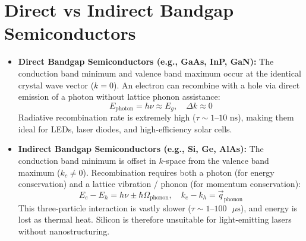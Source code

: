 \section{Direct vs Indirect Bandgap Semiconductors}
\begin{itemize}[leftmargin=*,itemsep=3pt]
    \item \textbf{Direct Bandgap Semiconductors (e.g., GaAs, InP, GaN):} The conduction band minimum and valence band maximum occur at the identical crystal wave vector ($k = 0$). An electron can recombine with a hole via direct emission of a photon without lattice phonon assistance:
    \begin{equation}
    E_{\text{photon}} = h\nu \approx E_g, \quad \Delta k \approx 0
    \end{equation}
    Radiative recombination rate is extremely high ($\tau \sim 1\text{--}10\text{ ns}$), making them ideal for LEDs, laser diodes, and high-efficiency solar cells.
    \item \textbf{Indirect Bandgap Semiconductors (e.g., Si, Ge, AlAs):} The conduction band minimum is offset in $k$-space from the valence band maximum ($k_c \ne 0$). Recombination requires both a photon (for energy conservation) and a lattice vibration / phonon (for momentum conservation):
    \begin{equation}
    E_e - E_h = h\nu \pm \hbar\Omega_{\text{phonon}}, \quad k_e - k_h = \vec{q}_{\text{phonon}}
    \end{equation}
    This three-particle interaction is vastly slower ($\tau \sim 1\text{--}100\text{ }\mu\text{s}$), and energy is lost as thermal heat. Silicon is therefore unsuitable for light-emitting lasers without nanostructuring.
\end{itemize}

